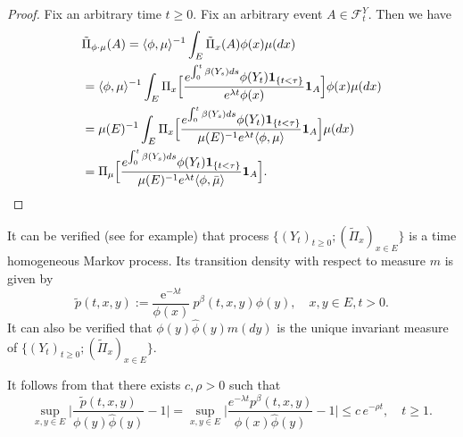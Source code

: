 \documentclass[12pt,a4paper]{amsart}
\theoremstyle{plain}
\theoremstyle{definition}
\numberwithin{equation}{section}
\begin{document}
\begin{proof}
	Fix an arbitrary time $t\geq 0$. Fix an arbitrary event $A \in \mathscr F_t^Y$.
	Then we have
\begin{align}
	&\tilde{\Pi}_{\phi\cdot\mu}(A)
	= \langle\phi, \mu\rangle^{-1} \int_E \tilde \Pi_x(A)\phi(x)\mu(dx)
	\\&=\langle\phi, \mu\rangle^{-1} \int_E  \Pi_x\Big[\frac{e^{\int_0^t \beta(Y_s)ds}\phi(Y_t) \mathbf 1_{\{t<\tau\}}}{e^{\lambda t}\phi(x)} \mathbf 1_A\Big]\phi(x)\mu(dx)
	\\&= \mu(E)^{-1}\int_E  \Pi_x\Big[\frac{e^{\int_0^t \beta(Y_s)ds}\phi(Y_t) \mathbf 1_{\{t<\tau\}}}{\mu(E)^{-1}e^{\lambda t}\langle \phi,\mu\rangle} \mathbf 1_A\Big]\mu(dx)
	\\&= \Pi_{\mu}\Big[\frac{e^{\int_0^t \beta(Y_s)ds}\phi(Y_t) \mathbf 1_{\{t<\tau\}}}{\mu(E)^{-1} e^{\lambda t}\langle \phi,\bar\mu\rangle} \mathbf 1_A\Big].
	\qedhere
\end{align}
\end{proof}
	It can be verified (see \cite{KimSong2008Intrinsic} for example) that process $\{(Y_t)_{t\geq 0}; (\widetilde\Pi_x)_{x\in E}\}$ is a time homogeneous Markov process.  Its transition density with respect to measure $m$ is given by
\begin{equation}
\label{eq: tilde p}
    \tilde p(t, x, y)
    :=\frac{\mbox{e}^{-\lambda t}}{\phi(x)}\ p^\beta(t, x, y)\phi(y),
    \quad x,y \in E,t>0.
\end{equation}
	It can also be verified that $\phi(y)\hat{\phi}(y)m(dy)$ is the unique invariant measure of $\{(Y_t)_{t\geq 0}; (\widetilde\Pi_x)_{x\in E}\}$.

	It follows from \cite[Theorem 2.7]{KimSong2008Intrinsic} that there exists $c, \rho > 0$ such that
\begin{equation}\label{IU}
	\sup_{x,y\in E}\Big|\frac{\tilde p(t,x,y)}{\phi(y) \hat\phi(y)}- 1\Big|
	=\sup_{x,y\in E}\Big|\frac{e^{-\lambda t}p^\beta(t,x,y)}{\phi(x) \hat\phi(y)}- 1\Big|
	\leq c\,e^{-\rho t},
	\quad t\geq 1.
\end{equation}
\end{document}

